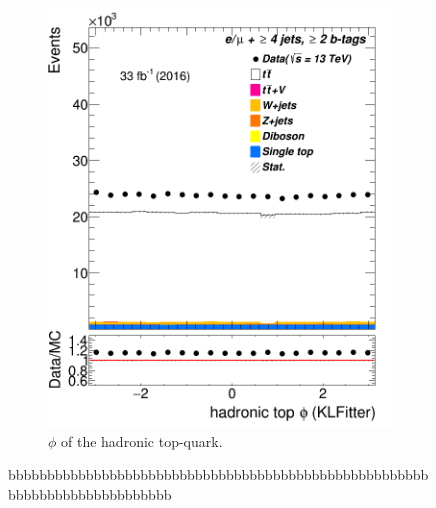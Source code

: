 \begin{figure}
\begin{subfigure}{0.35\textwidth}
		\includegraphics[width=\linewidth]{ControlPlots_emujets_2016_4incl_2incl/klf_topHad_phi_emujets_2016.png}
		\caption{$\phi$ of the hadronic top-quark.} \label{fig:22}
	\end{subfigure}
	\caption{bbbbbbbbbbbbbbbbbbbbbbbbbbbbbbbbbbbbbbbbbbbbbbbbbbbbbbbbbbbbbbbbbbbbbbbbbbb}
\end{figure}	








